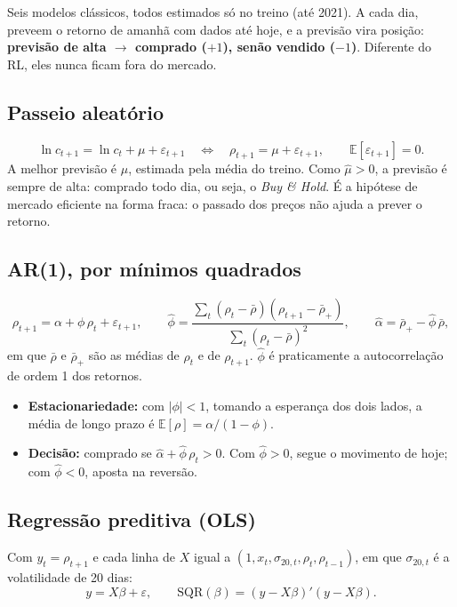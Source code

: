 \documentclass[11pt,a4paper]{article}
\begin{document}
Seis modelos clássicos, todos estimados só no treino (até 2021). A cada dia, preveem o retorno de amanhã com dados até hoje, e a previsão vira posição: \textbf{previsão de alta $\to$ comprado ($+1$), senão vendido ($-1$)}. Diferente do RL, eles nunca ficam fora do mercado.

\subsection{Passeio aleatório}

\[
  \ln c_{t+1} = \ln c_t + \mu + \varepsilon_{t+1} \quad\Longleftrightarrow\quad \rho_{t+1} = \mu + \varepsilon_{t+1}, \qquad \mathbb{E}[\varepsilon_{t+1}] = 0.
\]
A melhor previsão é $\mu$, estimada pela média do treino. Como $\hat\mu > 0$, a previsão é sempre de alta: comprado todo dia, ou seja, o \textit{Buy \& Hold}. É a hipótese de mercado eficiente na forma fraca: o passado dos preços não ajuda a prever o retorno.

\subsection{AR(1), por mínimos quadrados}

\[
  \rho_{t+1} = \alpha + \phi\,\rho_t + \varepsilon_{t+1}, \qquad
  \hat\phi = \frac{\sum_t (\rho_t - \bar\rho)(\rho_{t+1} - \bar\rho_+)}{\sum_t (\rho_t - \bar\rho)^2}, \qquad \hat\alpha = \bar\rho_+ - \hat\phi\,\bar\rho,
\]
em que $\bar\rho$ e $\bar\rho_+$ são as médias de $\rho_t$ e de $\rho_{t+1}$. $\hat\phi$ é praticamente a autocorrelação de ordem 1 dos retornos.
\begin{itemize}
  \item \textbf{Estacionariedade:} com $|\phi| < 1$, tomando a esperança dos dois lados, a média de longo prazo é $\mathbb{E}[\rho] = \alpha/(1 - \phi)$.
  \item \textbf{Decisão:} comprado se $\hat\alpha + \hat\phi\,\rho_t > 0$. Com $\hat\phi > 0$, segue o movimento de hoje; com $\hat\phi < 0$, aposta na reversão.
\end{itemize}

\subsection{Regressão preditiva (OLS)}

Com $y_t = \rho_{t+1}$ e cada linha de $X$ igual a $(1, x_t, \sigma_{20,t}, \rho_t, \rho_{t-1})$, em que $\sigma_{20,t}$ é a volatilidade de 20 dias:
\[
  y = X\beta + \varepsilon, \qquad \mathrm{SQR}(\beta) = (y - X\beta)'(y - X\beta).
\]
\end{document}
